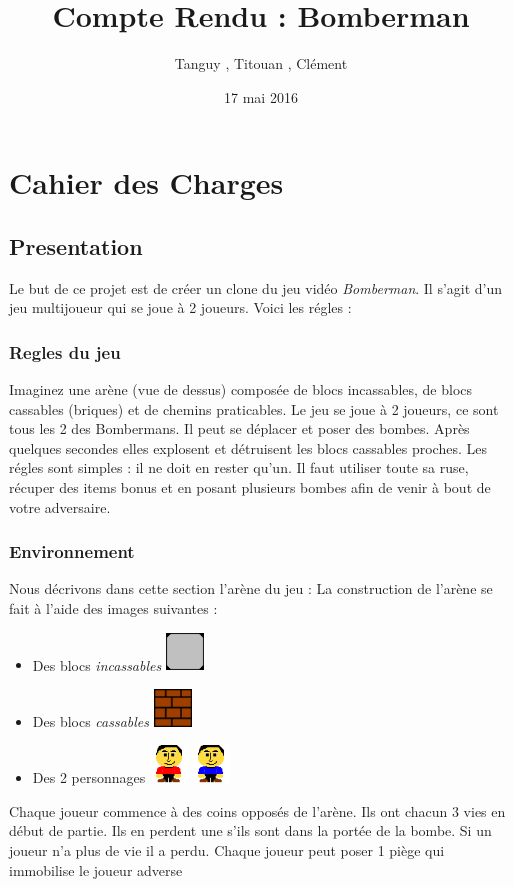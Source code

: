 \documentclass[a4paper,11pt,french]{article}
\title{Compte Rendu : Bomberman}
\author{Tanguy \bsc{Thomas}, Titouan \bsc{Rannou}, Clément \bsc{Guin}}
\date{17 mai 2016}
\begin{document}
\maketitle

\section{Cahier des Charges}
\subsection{Presentation}
Le but de ce projet est de créer un clone du jeu vidéo \textit{Bomberman}. Il s'agit d'un jeu multijoueur qui se joue à 2 joueurs. Voici les régles :
\subsubsection{Regles du jeu}
Imaginez une arène (vue de dessus) composée de blocs incassables, de blocs cassables (briques) et de chemins praticables. Le jeu se joue à 2 joueurs, ce sont tous les 2 des Bombermans. Il peut se déplacer et poser des bombes. Après quelques secondes elles explosent et détruisent les blocs cassables proches. Les régles sont simples : il ne doit en rester qu'un. Il faut utiliser toute sa ruse, récuper des items bonus et en posant plusieurs bombes afin de venir à bout de votre adversaire.

\subsubsection{Environnement}
Nous décrivons dans cette section l'arène du jeu :
La construction de l'arène se fait à l'aide des images suivantes :
\begin{itemize}
\item Des blocs \textit{incassables} %
\includegraphics[width=1cm,angle=0]{blocs}
\item Des blocs \textit{cassables} %
\includegraphics[width=1cm,angle=0]{briques}
\item Des  2 personnages  %
\includegraphics[width=1cm,angle=0]{joueur1}
\includegraphics[width=1cm,angle=0]{joueur2}
\end{itemize}
Chaque joueur commence à des coins opposés de l'arène. Ils ont chacun 3 vies en début de partie. Ils en perdent une s'ils sont dans la portée de la bombe. Si un joueur n'a plus de vie il a perdu. Chaque joueur peut poser 1 piège qui immobilise le joueur adverse
\end{document}

